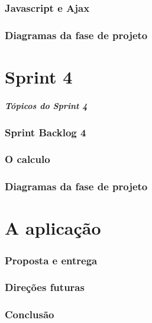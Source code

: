 \documentclass[12pt,a4paper]{beamer}
\begin{document}
		\section{Javascript e Ajax}
		\section{Diagramas da fase de projeto}
	\part{Sprint 4}
		
		\begin{frame}
			\frametitle{Tópicos do Sprint 4}
			\tableofcontents[pausesections]
		\end{frame}	
 		\section{Sprint Backlog 4}
		\section{O calculo}
		\section{Diagramas da fase de projeto}
	\part{A aplicação}
		\section{Proposta e entrega}
		\section{Direções futuras}
		\section{Conclusão}
\end{document}
